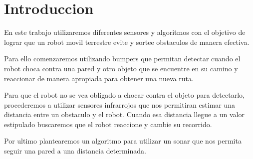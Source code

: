 \section{Introduccion}

En este trabajo utilizaremos diferentes sensores y algoritmos con el objetivo de lograr que un robot movil terrestre evite y sortee obstaculos de manera efectiva.

Para ello comenzaremos utilizando bumpers que permitan detectar cuando el robot choca contra una pared y otro objeto que se encuentre en su camino y reaccionar de manera apropiada para obtener una nueva ruta.

Para que el robot no se vea obligado a chocar contra el objeto para detectarlo, procederemos a utilizar sensores infrarrojos que nos permitiran estimar una distancia entre un obstaculo y el robot. Cuando esa distancia llegue a un valor estipulado buscaremos que el robot reaccione y cambie su recorrido.

Por ultimo plantearemos un algoritmo para utilizar un sonar que nos permita seguir una pared a una distancia determinada.